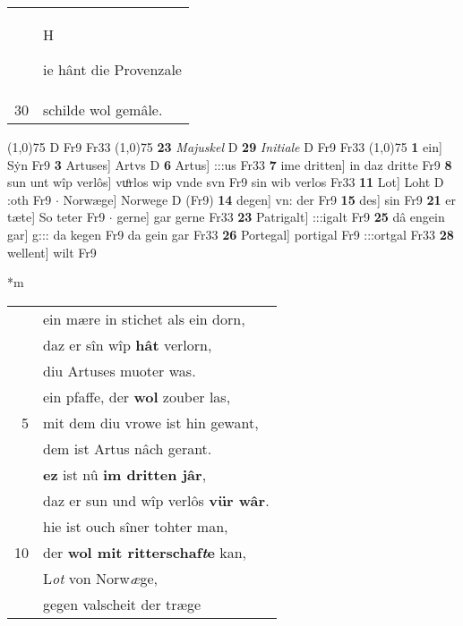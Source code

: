 \documentclass[8pt,a4paper,notitlepage]{article}
\begin{document}
\begin{table}[ht]
\begin{minipage}[t]{0.5\linewidth}
\begin{tabular}{rl}
 & \begin{large}H\end{large}ie hânt die Provenzale\\ 
30 & schilde wol gemâle.\\ 
\end{tabular}
\scriptsize
\line(1,0){75} \newline
D Fr9 Fr33 \newline
\line(1,0){75} \newline
\textbf{23} \textit{Majuskel} D  \textbf{29} \textit{Initiale} D Fr9 Fr33  \newline
\line(1,0){75} \newline
\textbf{1} ein] Sẏn Fr9 \textbf{3} Artuses] Artvs D \textbf{6} Artus] :::us Fr33 \textbf{7} ime dritten] in daz dritte Fr9 \textbf{8} sun unt wîp verlôs] vuͦrlos wip vnde svn Fr9 sin wib verlos Fr33 \textbf{11} Lot] Loht D :oth Fr9  $\cdot$ Norwæge] Norwege D (Fr9) \textbf{14} degen] vn: der Fr9 \textbf{15} des] sin Fr9 \textbf{21} er tæte] So teter Fr9  $\cdot$ gerne] gar gerne Fr33 \textbf{23} Patrigalt] :::igalt Fr9 \textbf{25} dâ engein gar] g::: da kegen Fr9 da gein gar Fr33 \textbf{26} Portegal] portigal Fr9 :::ortgal Fr33 \textbf{28} wellent] wilt Fr9 \newline
\end{minipage}
\hspace{0.5cm}
\begin{minipage}[t]{0.5\linewidth}
\small
\begin{center}*m
\end{center}
\begin{tabular}{rl}
 & ein mære in stichet als ein dorn,\\ 
 & daz er sîn wîp \textbf{hât} verlorn,\\ 
 & diu Artuses muoter was.\\ 
 & ein pfaffe, der \textbf{wol} zouber las,\\ 
5 & mit dem diu vrowe ist hin gewant,\\ 
 & dem ist Artus nâch gerant.\\ 
 & \textbf{ez} ist nû \textbf{im dritten jâr},\\ 
 & daz er sun und wîp verlôs \textbf{vür wâr}.\\ 
 & hie ist ouch sîner tohter man,\\ 
10 & der \textbf{wol mit ritterschaf\textit{t}e} kan,\\ 
 & L\textit{ot} von Norw\textit{æ}ge,\\ 
 & gegen valscheit der træge\\ 

\end{tabular}
\end{minipage}
\end{table}
\end{document}
